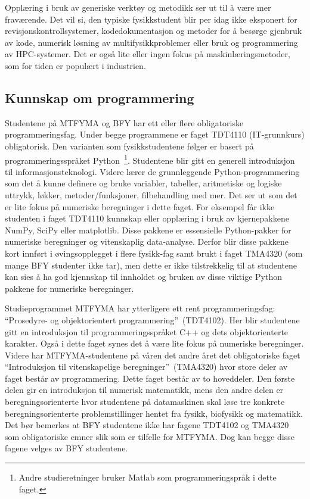 \documentclass{article}
\begin{document}
Opplæring i bruk av generiske verktøy og metodikk ser ut til å være mer fraværende. Det vil si, den typiske fysikkstudent blir per idag ikke eksponert for revisjonskontrollsystemer, kodedokumentasjon og metoder for å besørge gjenbruk av kode, numerisk løsning av multifysikkproblemer eller bruk og programmering av HPC-systemer. Det er også lite eller ingen fokus på maskinlæringsmetoder, som for tiden er populært i industrien.

\subsection{Kunnskap om programmering}
\label{Sec:Programming}
Studentene på MTFYMA og BFY har ett eller flere obligatoriske programmeringsfag. Under begge programmene er faget TDT4110 (IT-grunnkurs) obligatorisk. Den varianten som fysikkstudentene følger er basert på programmeringsspråket Python~\footnote{Andre studieretninger bruker Matlab som programmeringspråk i dette faget.}. Studentene blir gitt en generell introduksjon til informasjonsteknologi. Videre lærer de grunnleggende Python-programmering som det å kunne definere og bruke variabler, tabeller, aritmetiske og logiske uttrykk, løkker, metoder/funksjoner, filbehandling med mer. Det ser ut som det er lite fokus på numeriske beregninger i dette faget. For eksempel får ikke studenten i faget TDT4110 kunnskap eller opplæring i bruk av kjernepakkene NumPy, SciPy eller matplotlib. Disse pakkene er essensielle Python-pakker for numeriske beregninger og vitenskaplig data-analyse. Derfor blir disse pakkene kort innført i øvingsopplegget i flere fysikk-fag samt brukt i faget TMA4320 (som mange BFY studenter ikke tar), men dette er ikke tilstrekkelig til at studentene kan sies å ha god kjennskap til innholdet og bruken av disse viktige Python pakkene for numeriske beregninger. 

Studieprogrammet MTFYMA har ytterligere ett rent programmeringsfag: ``Prosedyre- og objektorientert programmering''~(TDT4102). Her blir studentene gitt en introduksjon til programmeringsspråket C++ og dets objektorienterte karakter. Også i dette faget synes det å være lite fokus på numeriske beregninger. Videre har MTFYMA-studentene på våren det andre året det obligatoriske faget ``Introduksjon til vitenskapelige beregninger''~(TMA4320) hvor store deler av faget består av programmering. Dette faget består av to hoveddeler. Den første delen gir en introduksjon til numerisk matematikk, mens den andre delen er beregningsorienterte hvor studentene på datamaskinen skal løse tre konkrete beregningsorienterte problemstillinger hentet fra fysikk, biofysikk og matematikk. Det bør bemerkes at BFY studentene ikke har fagene TDT4102 og TMA4320 som obligatoriske emner slik som er tilfelle for MTFYMA. Dog kan begge disse fagene velges av BFY studentene.
\end{document}

